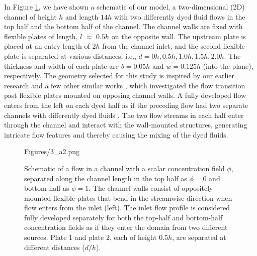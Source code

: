 \documentclass[reprint,a4paper,fleqn]{cas-dc} %
\providecommand{\DIFadd}[1]{{\protect\color{blue}\uwave{#1}}} %
\providecommand{\DIFaddbegin}{} %
\providecommand{\DIFaddend}{} %
\begin{document}
	In Figure \ref{fig:schematic}, we have shown a schematic of our model, a two-dimensional (2D) channel of height $h$ and length $14h$ with two differently dyed fluid flows in the top half and the bottom half of the channel. The channel walls are fixed with flexible plates of length, $l$ $\approx$ $0.5h$ on the opposite wall. The upstream plate is placed at an entry length of $2h$ from the channel inlet, and the second flexible plate is separated at various distances, i.e., $d=0h, 0.5h,1.0h,1.5h, 2.0h$. The thickness and width of each plate are $b = 0.05h$ and $w=0.125h$ (into the plane), respectively. The geometry selected for this study is inspired by our earlier research and a few other similar works \cite{Self2019, Jin2018}, which investigated the flow transition past flexible plates mounted on opposing channel walls. A fully developed flow enters from the left on each dyed half as if the preceding flow had two separate channels with differently dyed fluids \DIFaddbegin \DIFadd{\mbox{%
\cite{Jing2022,Liao2023}}\hspace{0pt}%
}\DIFaddend . The two flow streams in each half enter through the channel and interact with the wall-mounted structures, generating intricate flow features and thereby causing the mixing of the dyed fluids.
			\begin{figure}[pos=b]
		\begin{minipage}[c]{1\linewidth}	
				\begin{overpic}[width=1\linewidth]{Figures/3_a2.png}
				\end{overpic}
			\end{minipage}
			\caption{Schematic of a flow in a channel with a scalar concentration field $\phi$, separated along the channel length in the top half as $\phi=0$ and bottom half as $\phi=1$. The channel walls consist of oppositely mounted flexible plates that bend in the streamwise direction when flow enters from the inlet (left). The inlet flow profile is considered fully developed separately for both the top-half and bottom-half concentration fields as if they enter the domain from two different sources. Plate 1 and plate 2, each of height $0.5h$, are separated at different distances ($d/h$).}
			\label{fig:schematic}
		\end{figure}\vspace{0cm}
\end{document}
